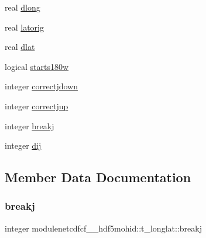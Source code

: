 \begin{DoxyCompactItemize}
real \mbox{\hyperlink{structmodulenetcdfcf__2__hdf5mohid_1_1t__longlat_a0b60c6f8be08339e85fc235ccbdb0e28}{dlong}}
\item 
real \mbox{\hyperlink{structmodulenetcdfcf__2__hdf5mohid_1_1t__longlat_af8ff9e20e26d456a7ae4e7f5c2e1b487}{latorig}}
\item 
real \mbox{\hyperlink{structmodulenetcdfcf__2__hdf5mohid_1_1t__longlat_ac36c4f15f75a1c875ace0d41f0d4169d}{dlat}}
\item 
logical \mbox{\hyperlink{structmodulenetcdfcf__2__hdf5mohid_1_1t__longlat_a8d1b9d1b2baf39961fcfc91d846811bb}{starts180w}}
\item 
integer \mbox{\hyperlink{structmodulenetcdfcf__2__hdf5mohid_1_1t__longlat_a75b4b96cdb83d4a06f33573c536e4388}{correctjdown}}
\item 
integer \mbox{\hyperlink{structmodulenetcdfcf__2__hdf5mohid_1_1t__longlat_a840b54cac8b4f55db295c2b4a2dbf08a}{correctjup}}
\item 
integer \mbox{\hyperlink{structmodulenetcdfcf__2__hdf5mohid_1_1t__longlat_a29501a7218b595d4e75b8d57246c96b9}{breakj}}
\item 
integer \mbox{\hyperlink{structmodulenetcdfcf__2__hdf5mohid_1_1t__longlat_a17d6ad97474198f53d243f74b5c0f706}{dij}}
\end{DoxyCompactItemize}


\subsection{Member Data Documentation}
\mbox{\label{structmodulenetcdfcf__2__hdf5mohid_1_1t__longlat_a29501a7218b595d4e75b8d57246c96b9}} 
\subsubsection{\texorpdfstring{breakj}{breakj}}
{\footnotesize\ttfamily integer modulenetcdfcf\+\_\+\_\+hdf5mohid\+::t\+\_\+longlat\+::breakj\hspace{0.3cm}{\ttfamily [private]}}

\mbox{\label{structmodulenetcdfcf__2__hdf5mohid_1_1t__longlat_a75b4b96cdb83d4a06f33573c536e4388}} 
